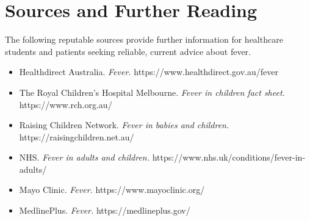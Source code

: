 \section*{Sources and Further Reading}
The following reputable sources provide further information for healthcare students and patients seeking reliable, current advice about fever.
\begin{itemize}
    \item Healthdirect Australia. \textit{Fever.} https://www.healthdirect.gov.au/fever
    \item The Royal Children's Hospital Melbourne. \textit{Fever in children fact sheet.} https://www.rch.org.au/
    \item Raising Children Network. \textit{Fever in babies and children.} https://raisingchildren.net.au/
    \item NHS. \textit{Fever in adults and children.} https://www.nhs.uk/conditions/fever-in-adults/
    \item Mayo Clinic. \textit{Fever.} https://www.mayoclinic.org/
    \item MedlinePlus. \textit{Fever.} https://medlineplus.gov/
\end{itemize}
